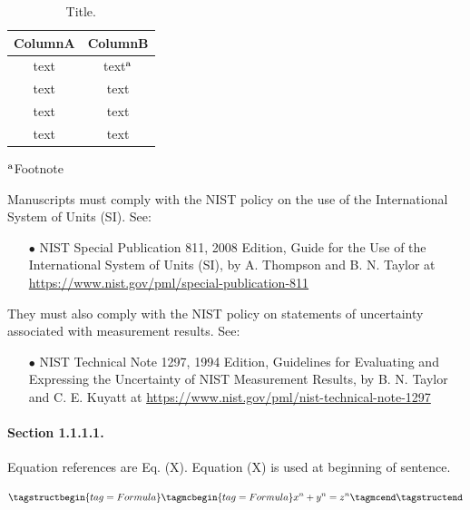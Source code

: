  
\begin{table}[h]
\tagpdfparaOff {}
	\centering
	\caption{Title.}
	\label{tab:example}
	\small
	\begin{tabular}{cc}
		\hline
		ColumnA & ColumnB \\ \hline
		text & text{\scriptsize $^{\rm a}$} \\
		text & text \\
		text & text \\
		text & text \\
		\hline
	\end{tabular}
	
	{\footnotesize 	{\scriptsize $^{\rm a}$}Footnote}
\tagmcend
\tagstructend
\end{table}
Manuscripts must comply with the NIST policy on the use of the International System of Units (SI). See:
\begin{itemize}
    \item[$\bullet$] NIST Special Publication 811, 2008 Edition, Guide for the Use of the International System of Units (SI), by A. Thompson and B. N. Taylor at \href{https://www.nist.gov/pml/special-publication-811}{https://www.nist.gov/pml/special-publication-811}
\end{itemize}
They must also comply with the NIST policy on statements of uncertainty associated with measurement results. See:
\begin{itemize}
    \item[$\bullet$] NIST Technical Note 1297, 1994 Edition, Guidelines for Evaluating and Expressing the Uncertainty of NIST Measurement Results, by B. N. Taylor and C. E. Kuyatt at \href{https://www.nist.gov/pml/nist-technical-note-1297}{https://www.nist.gov/pml/nist-technical-note-1297}
\end{itemize}

\paragraph{Section 1.1.1.1.}
\tagmcend
 \tagstructend
 \tagpdfparaOn
Equation references are Eq. (X). Equation (X) is used at beginning of sentence.
 
\tagpdfparaOff 
\begin{equation}
\tagstructbegin{tag=Formula}
 \tagmcbegin{tag=Formula}
\label{eq:example}
{x}^{n} + {y}^{n} = {z}^{n}
\tagmcend
\tagstructend
\end{equation}

